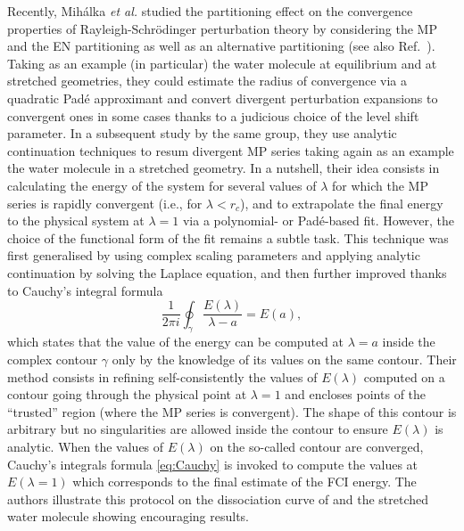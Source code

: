 \documentclass[aps,prb,reprint,noshowkeys,linenumbers,superscriptaddress]{revtex4-1}
\newcommand{\latin}[1]{#1}
\newcommand{\ie}{\latin{i.e.}}
\begin{document}
Recently, Mih\'alka \textit{et al.} studied the partitioning effect on the convergence properties of Rayleigh-Schr\"odinger perturbation theory by considering the MP and the EN partitioning as well as an alternative partitioning \cite{Mihalka_2017a} (see also Ref.~).
Taking as an example (in particular) the water molecule at equilibrium and at stretched geometries, they could estimate the radius of convergence via a quadratic Pad\'e approximant and convert divergent perturbation expansions to convergent ones in some cases thanks to a judicious choice of the level shift parameter.
In a subsequent study by the same group, \cite{Mihalka_2017b} they use analytic continuation techniques to resum divergent MP series \cite{Goodson_2011} taking again as an example the water molecule in a stretched geometry.
In a nutshell, their idea consists in calculating the energy of the system for several values of $\lambda$ for which the MP series is rapidly convergent (\ie, for $\lambda < r_c$), and to extrapolate the final energy to the physical system at $\lambda = 1$ via a polynomial- or Pad\'e-based fit. 
However, the choice of the functional form of the fit remains a subtle task.
This technique was first generalised by using complex scaling parameters and applying analytic continuation by solving the Laplace equation, \cite{Surjan_2018} and then further improved thanks to Cauchy's integral formula \cite{Mihalka_2019}
\begin{equation}
	\label{eq:Cauchy}
	\frac{1}{2\pi i} \oint_{\gamma} \frac{E(\lambda)}{\lambda - a} = E(a),
\end{equation}
which states that the value of the energy can be computed at $\lambda=a$ inside the complex contour $\gamma$ only by the knowledge of its values on the same contour.
Their method consists in refining self-consistently the values of $E(\lambda)$ computed on a contour going through the physical point at $\lambda = 1$ and encloses points of the ``trusted'' region (where the MP series is convergent). The shape of this contour is arbitrary but no singularities are allowed inside the contour to ensure $E(\lambda)$ is analytic. 
When the values of $E(\lambda)$ on the so-called contour are converged, Cauchy's integrals formula \eqref{eq:Cauchy} is invoked to compute the values at $E(\lambda=1)$ which corresponds to the final estimate of the FCI energy.
The authors illustrate this protocol on the dissociation curve of  and the stretched water molecule showing encouraging results. \cite{Mihalka_2019} 
\end{document}
